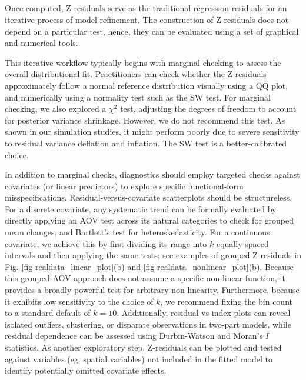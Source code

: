\subsection{}


Once computed, Z-residuals serve as the traditional regression residuals for an iterative process of model refinement. The construction of Z-residuals does not depend on a particular test, hence, they can be evaluated using a set of graphical and numerical tools.

This iterative workflow typically begins with marginal checking to assess the overall distributional fit. Practitioners can check whether the Z-residuals approximately follow a normal reference distribution visually using a QQ plot, and numerically using a normality test such as the SW test. For marginal checking, we also explored a $\chi^2$ test, adjusting the degrees of freedom to account for posterior variance shrinkage. However, we do not recommend this test. As shown in our simulation studies, it might perform poorly due to severe sensitivity to residual variance deflation and inflation. The SW test is a better-calibrated choice.

In addition to marginal checks, diagnostics should employ targeted checks against covariates (or linear predictors) to explore specific functional-form misspecifications. Residual-versus-covariate scatterplots should be structureless. For a discrete covariate, any systematic trend can be formally evaluated by directly applying an AOV test across its natural categories to check for grouped mean changes, and Bartlett's test for heteroskedasticity. For a continuous covariate, we achieve this by first dividing its range into $k$ equally spaced intervals and then applying the same tests; see examples of grouped Z-residuals in Fig. \ref{fig-realdata_linear_plot}(b) and \ref{fig-realdata_nonlinear_plot}(b). Because this grouped AOV approach does not assume a specific non-linear function, it provides a broadly powerful test for arbitrary non-linearity. Furthermore, because it exhibits low sensitivity to the choice of $k$, we recommend fixing the bin count to a standard default of $k=10$. Additionally, residual-vs-index plots can reveal isolated outliers, clustering, or disparate observations in two-part models, while residual dependence can be assessed using Durbin-Watson and Moran's $I$ statistics. As another exploratory step, Z-residuals can be plotted and tested against variables (eg. spatial variables) not included in the fitted model to identify potentially omitted covariate effects.

